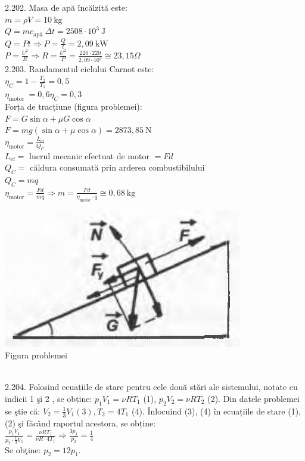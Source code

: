 2.202. Masa de apă încălzită este:\\ $m=\rho V=10 \mathrm{~kg}$\\ $Q=m c_{\text {apă }} \Delta t=2508 \cdot 10^{3} \mathrm{~J}$\\ $Q=P t \Rightarrow P=\frac{Q}{t}=2,09 \mathrm{~kW}$\\ $P=\frac{U^{2}}{R} \Rightarrow R=\frac{U^{2}}{P}=\frac{220 \cdot 220}{2,09 \cdot 10^{3}} \cong 23,15 \Omega$\\

2.203. Randamentul ciclului Carnot este:\\ $\eta_{C}=1-\frac{T_{2}}{T_{1}}=0,5$\\ $\eta_{\text {motor }}=0,6 \eta_{C}=0,3$\\ Forța de tracțiune (figura problemei):\\ $F=G \sin \alpha+\mu G \cos \alpha$\\ $F=m g(\sin \alpha+\mu \cos \alpha)=2873,85 \mathrm{~N}$\\ $\eta_{\text{motor}}=\frac{L_{\text{ef}}}{Q_{C}}$\\ $L_{\text{ef}}=$ lucrul mecanic efectuat de motor $=F d$\\ $Q_{C}=$ căldura consumată prin arderea combustibilului\\ $Q_{C}=m q$\\ $\eta_{\text{motor}}=\frac{F d}{m q} \Rightarrow m=\frac{F d}{\eta_{\text{motor}} \cdot q} \cong 0,68 \mathrm{~kg}$\\ \begin{center} \includegraphics[width=0.4\linewidth]{images/2025_07_01_5b3ff9fa0d508c8e9f17g-314}\\ Figura problemei \end{center}\\

2.204. Folosind ecuațiile de stare pentru cele două stări ale sistemului, notate cu indicii 1 şi 2 , se obține: $p_{1} V_{1}=\nu R T_{1}$ (1), $p_{2} V_{2}=\nu R T_{2}$ (2). Din datele problemei se ştie că: $V_{2}=\frac{1}{3} V_{1}(3), T_{2}=4 T_{1}$ (4). Înlocuind (3), (4) în ecuațiile de stare (1), (2) şi fäcând raportul acestora, se obține:\\ $\frac{p_{1} V_{1}}{p_{2} \cdot \frac{1}{3} V_{1}}=\frac{\nu R T_{1}}{\nu R \cdot 4 T_{1}} \Rightarrow \frac{3 p_{1}}{p_{2}}=\frac{1}{4} \tag{5}$\\ Se obţine: $p_{2}=12 p_{1}$.\\

